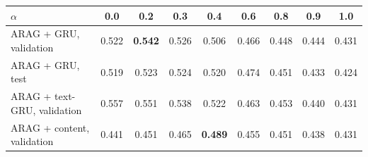 \begin{tabular}{lcccccccc}
\toprule
$\alpha$ & 0.0 & 0.2 & 0.3 & 0.4 & 0.6 & 0.8 & 0.9 & 1.0 \\
\midrule
ARAG + GRU, validation & 0.522 & \textbf{0.542} & 0.526 & 0.506 & 0.466 & 0.448 & 0.444 & 0.431 \\
ARAG + GRU, test & 0.519 & 0.523 & 0.524 & 0.520 & 0.474 & 0.451 & 0.433 & 0.424 \\
ARAG + text-GRU, validation & 0.557 & 0.551 & 0.538 & 0.522 & 0.463 & 0.453 & 0.440 & 0.431 \\
ARAG + content, validation & 0.441 & 0.451 & 0.465 & \textbf{0.489} & 0.455 & 0.451 & 0.438 & 0.431 \\
\bottomrule
\end{tabular}
